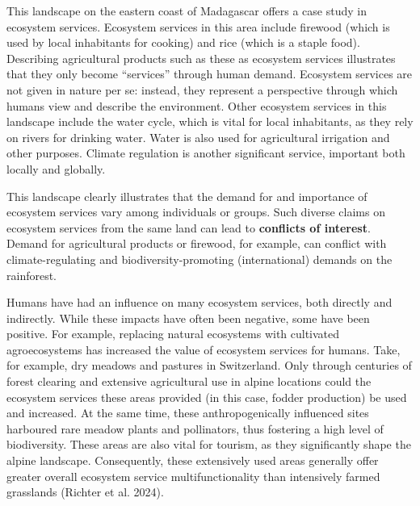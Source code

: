 \documentclass[
  a4paper,
  DIV=11,
  numbers=noendperiod,
  oneside,
  openany]{scrreprt}
\begin{document}
\begin{tcolorbox}[enhanced jigsaw, arc=.35mm, bottomrule=.15mm, bottomtitle=1mm, breakable, colback=white, colbacktitle=quarto-callout-tip-color!10!white, colframe=quarto-callout-tip-color-frame, coltitle=black, left=2mm, leftrule=.75mm, opacityback=0, opacitybacktitle=0.6, rightrule=.15mm, title={Case study: Ecosystem services in Madagascar}, titlerule=0mm, toprule=.15mm, toptitle=1mm]

This landscape on the eastern coast of Madagascar offers a case study in
ecosystem services. Ecosystem services in this area include firewood
(which is used by local inhabitants for cooking) and rice (which is a
staple food). Describing agricultural products such as these as
ecosystem services illustrates that they only become ``services''
through human demand. Ecosystem services are not given in nature per se:
instead, they represent a perspective through which humans view and
describe the environment. Other ecosystem services in this landscape
include the water cycle, which is vital for local inhabitants, as they
rely on rivers for drinking water. Water is also used for agricultural
irrigation and other purposes. Climate regulation is another significant
service, important both locally and globally.

This landscape clearly illustrates that the demand for and importance of
ecosystem services vary among individuals or groups. Such diverse claims
on ecosystem services from the same land can lead to \textbf{conflicts
of interest}. Demand for agricultural products or firewood, for example,
can conflict with climate-regulating and biodiversity-promoting
(international) demands on the rainforest.

\end{tcolorbox}

Humans have had an influence on many ecosystem services, both directly
and indirectly. While these impacts have often been negative, some have
been positive. For example, replacing natural ecosystems with cultivated
agroecosystems has increased the value of ecosystem services for humans.
Take, for example, dry meadows and pastures in Switzerland. Only through
centuries of forest clearing and extensive agricultural use in alpine
locations could the ecosystem services these areas provided (in this
case, fodder production) be used and increased. At the same time, these
anthropogenically influenced sites harboured rare meadow plants and
pollinators, thus fostering a high level of biodiversity. These areas
are also vital for tourism, as they significantly shape the alpine
landscape. Consequently, these extensively used areas generally offer
greater overall ecosystem service multifunctionality than intensively
farmed grasslands (Richter et al. 2024).
\end{document}
